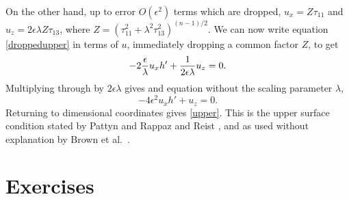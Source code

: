 \documentclass[11pt,final,reqno]{amsart}
\theoremstyle{remark}
\theoremstyle{definition}
\newcommand{\eps}{\epsilon}
\begin{document}
On the other hand, up to error $O(\eps^2)$ terms which are dropped, $u_x = Z \tau_{11}$ and $u_z = 2 \eps\lambda Z \tau_{13}$, where $Z=(\tau_{11}^2+\lambda^2\tau_{13}^2)^{(n-1)/2}$.  We can now write equation \eqref{droppedupper} in terms of $u$, immediately dropping a common factor $Z$, to get
   $$- 2 \eol u_x h' + \frac{1}{2\eps\lambda} u_z = 0.$$
Multiplying through by $2\eps\lambda$ gives and equation without the scaling parameter $\lambda$,
\begin{equation}
- 4 \eps^2 u_x h' + u_z = 0.  \label{sweet}
\end{equation}
Returning to dimensional coordinates gives \eqref{upper}.  This is the upper surface condition stated by Pattyn \cite{Pattyn03} and Rappaz and Reist \cite{RappazReist05}, and as used without explanation by Brown et al.~\cite{BrownSmithAhmadia}.


\newpage
\section{Exercises}

\renewcommand{\labelenumi}{\emph{\alph{enumi})}\quad}
\end{document}
